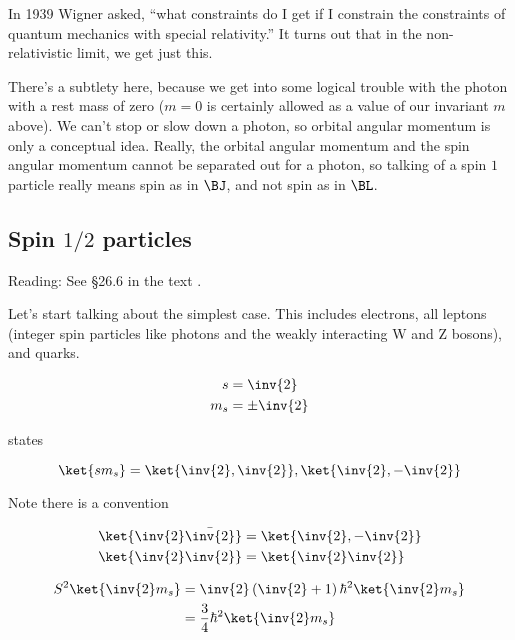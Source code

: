 In 1939 Wigner asked, ``what constraints do I get if I constrain the constraints of quantum mechanics with special relativity.''  It turns out that in the non-relativistic limit, we get just this.

There's a subtlety here, because we get into some logical trouble with the photon with a rest mass of zero ($m = 0$ is certainly allowed as a value of our invariant $m$ above).  We can't stop or slow down a photon, so orbital angular momentum is only a conceptual idea.  Really, the orbital angular momentum and the spin angular momentum cannot be separated out for a photon, so talking of a spin $1$ particle really means spin as in $\BJ$, and not spin as in $\BL$.

\subsection{Spin $1/2$ particles}

Reading: See \S 26.6 in the text \cite{desai2009quantum}.

Let's start talking about the simplest case.  This includes electrons, all leptons (integer spin particles like photons and the weakly interacting W and Z bosons), and quarks.

\begin{align}\label{eqn:qmTwoL13:410}
s &= \inv{2} \\
m_s &= \pm \inv{2}
\end{align}

states

\begin{equation}\label{eqn:qmTwoL13:430}
\ket{s m_s} = \ket{ \inv{2}, \inv{2} },\ket{ \inv{2}, -\inv{2} }
\end{equation}

Note there is a convention

\begin{align}\label{eqn:qmTwoL13:450}
\ket{ \inv{2} \bar{\inv{2}} } &= \ket{ \inv{2}, -\inv{2} } \\
\ket{ \inv{2} \inv{2} } &= \ket{ \inv{2} \inv{2} }
\end{align}

\begin{equation}\label{eqn:qmTwoL13:470}
\begin{aligned}
S^2 
\ket{\inv{2} m_s} 
&= 
\inv{2} \left( \inv{2} + 1 \right) \hbar^2 
\ket{\inv{2} m_s}  \\
&=
\frac{3}{4} \hbar^2 \ket{\inv{2} m_s}  \\
\end{aligned}
\end{equation}

